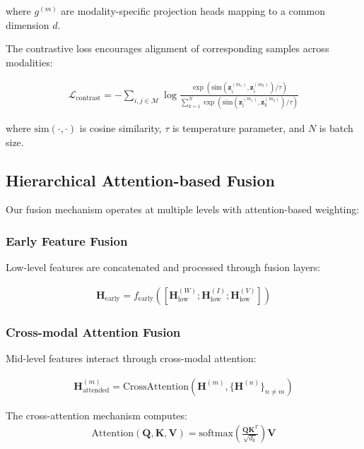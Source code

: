 \documentclass[journal]{IEEEtran}
\begin{document}
where $g^{(m)}$ are modality-specific projection heads mapping to a common dimension $d$.

The contrastive loss encourages alignment of corresponding samples across modalities:

\begin{align}
\mathcal{L}_{\text{contrast}} = -\sum_{i,j \in \mathcal{M}} \log \frac{\exp(\text{sim}(\mathbf{z}_i^{(m_1)}, \mathbf{z}_i^{(m_2)})/\tau)}{\sum_{k=1}^N \exp(\text{sim}(\mathbf{z}_i^{(m_1)}, \mathbf{z}_k^{(m_2)})/\tau)}
\end{align}

where $\text{sim}(\cdot, \cdot)$ is cosine similarity, $\tau$ is temperature parameter, and $N$ is batch size.

\subsection{Hierarchical Attention-based Fusion}

Our fusion mechanism operates at multiple levels with attention-based weighting:

\subsubsection{Early Feature Fusion}

Low-level features are concatenated and processed through fusion layers:

\begin{align}
\mathbf{H}_{\text{early}} = f_{\text{early}}([\mathbf{H}^{(W)}_{\text{low}}; \mathbf{H}^{(I)}_{\text{low}}; \mathbf{H}^{(V)}_{\text{low}}])
\end{align}

\subsubsection{Cross-modal Attention Fusion}

Mid-level features interact through cross-modal attention:

\begin{align}
\mathbf{H}_{\text{attended}}^{(m)} = \text{CrossAttention}(\mathbf{H}^{(m)}, \{\mathbf{H}^{(n)}\}_{n \neq m})
\end{align}

The cross-attention mechanism computes:
\begin{align}
\text{Attention}(\mathbf{Q}, \mathbf{K}, \mathbf{V}) = \text{softmax}\left(\frac{\mathbf{Q}\mathbf{K}^T}{\sqrt{d_k}}\right)\mathbf{V}
\end{align}
\end{document}
